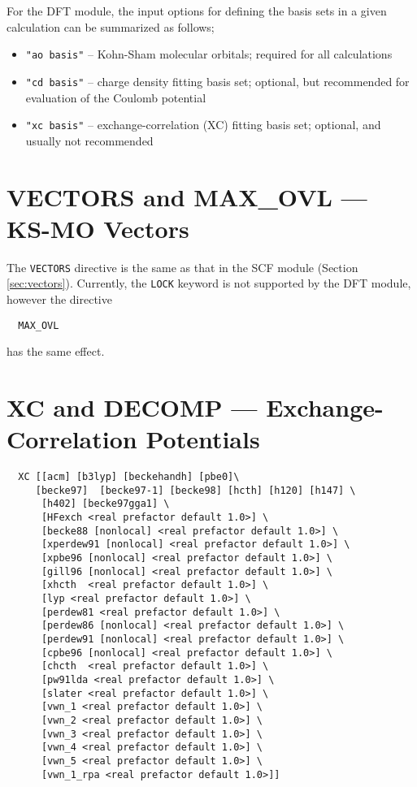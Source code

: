 For the DFT module, the input options for defining the basis sets in a given
calculation can be summarized as follows;
\begin{itemize}
\item {\tt "ao basis"} -- Kohn-Sham molecular orbitals; required for all 
calculations
\item {\tt "cd basis"} -- charge density fitting basis set; optional, but
recommended for evaluation of the Coulomb potential
\item {\tt "xc basis"} -- exchange-correlation (XC) fitting basis set; 
optional, and usually not recommended
\end{itemize}


\section{VECTORS and MAX\_OVL --- KS-MO Vectors}

The \verb+VECTORS+ directive is the same as that in the SCF module
(Section \ref{sec:vectors}).  Currently, the \verb+LOCK+ keyword
is not supported by the DFT module, however the directive
\begin{verbatim}
  MAX_OVL
\end{verbatim}
has the same effect.

\section{XC and DECOMP --- Exchange-Correlation Potentials}
\begin{verbatim}
  XC [[acm] [b3lyp] [beckehandh] [pbe0]\
     [becke97]  [becke97-1] [becke98] [hcth] [h120] [h147] \
      [h402] [becke97gga1] \
      [HFexch <real prefactor default 1.0>] \
      [becke88 [nonlocal] <real prefactor default 1.0>] \
      [xperdew91 [nonlocal] <real prefactor default 1.0>] \
      [xpbe96 [nonlocal] <real prefactor default 1.0>] \
      [gill96 [nonlocal] <real prefactor default 1.0>] \
      [xhcth  <real prefactor default 1.0>] \
      [lyp <real prefactor default 1.0>] \
      [perdew81 <real prefactor default 1.0>] \
      [perdew86 [nonlocal] <real prefactor default 1.0>] \
      [perdew91 [nonlocal] <real prefactor default 1.0>] \
      [cpbe96 [nonlocal] <real prefactor default 1.0>] \
      [chcth  <real prefactor default 1.0>] \
      [pw91lda <real prefactor default 1.0>] \
      [slater <real prefactor default 1.0>] \
      [vwn_1 <real prefactor default 1.0>] \
      [vwn_2 <real prefactor default 1.0>] \
      [vwn_3 <real prefactor default 1.0>] \
      [vwn_4 <real prefactor default 1.0>] \
      [vwn_5 <real prefactor default 1.0>] \
      [vwn_1_rpa <real prefactor default 1.0>]]
\end{verbatim}


